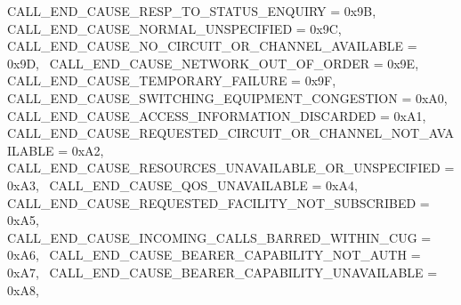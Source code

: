 \begin{DoxyItemize}
 C\+A\+L\+L\+\_\+\+E\+N\+D\+\_\+\+C\+A\+U\+S\+E\+\_\+\+R\+E\+S\+P\+\_\+\+T\+O\+\_\+\+S\+T\+A\+T\+U\+S\+\_\+\+E\+N\+Q\+U\+I\+RY = 0x9B,~\newline
 C\+A\+L\+L\+\_\+\+E\+N\+D\+\_\+\+C\+A\+U\+S\+E\+\_\+\+N\+O\+R\+M\+A\+L\+\_\+\+U\+N\+S\+P\+E\+C\+I\+F\+I\+ED = 0x9C,~\newline
 C\+A\+L\+L\+\_\+\+E\+N\+D\+\_\+\+C\+A\+U\+S\+E\+\_\+\+N\+O\+\_\+\+C\+I\+R\+C\+U\+I\+T\+\_\+\+O\+R\+\_\+\+C\+H\+A\+N\+N\+E\+L\+\_\+\+A\+V\+A\+I\+L\+A\+B\+LE = 0x9D,~\newline
 C\+A\+L\+L\+\_\+\+E\+N\+D\+\_\+\+C\+A\+U\+S\+E\+\_\+\+N\+E\+T\+W\+O\+R\+K\+\_\+\+O\+U\+T\+\_\+\+O\+F\+\_\+\+O\+R\+D\+ER = 0x9E,~\newline
 C\+A\+L\+L\+\_\+\+E\+N\+D\+\_\+\+C\+A\+U\+S\+E\+\_\+\+T\+E\+M\+P\+O\+R\+A\+R\+Y\+\_\+\+F\+A\+I\+L\+U\+RE = 0x9F,~\newline
 C\+A\+L\+L\+\_\+\+E\+N\+D\+\_\+\+C\+A\+U\+S\+E\+\_\+\+S\+W\+I\+T\+C\+H\+I\+N\+G\+\_\+\+E\+Q\+U\+I\+P\+M\+E\+N\+T\+\_\+\+C\+O\+N\+G\+E\+S\+T\+I\+ON = 0x\+A0,~\newline
 C\+A\+L\+L\+\_\+\+E\+N\+D\+\_\+\+C\+A\+U\+S\+E\+\_\+\+A\+C\+C\+E\+S\+S\+\_\+\+I\+N\+F\+O\+R\+M\+A\+T\+I\+O\+N\+\_\+\+D\+I\+S\+C\+A\+R\+D\+ED = 0x\+A1,~\newline
 C\+A\+L\+L\+\_\+\+E\+N\+D\+\_\+\+C\+A\+U\+S\+E\+\_\+\+R\+E\+Q\+U\+E\+S\+T\+E\+D\+\_\+\+C\+I\+R\+C\+U\+I\+T\+\_\+\+O\+R\+\_\+\+C\+H\+A\+N\+N\+E\+L\+\_\+\+N\+O\+T\+\_\+\+A\+V\+A\+I\+L\+A\+B\+LE = 0x\+A2,~\newline
 C\+A\+L\+L\+\_\+\+E\+N\+D\+\_\+\+C\+A\+U\+S\+E\+\_\+\+R\+E\+S\+O\+U\+R\+C\+E\+S\+\_\+\+U\+N\+A\+V\+A\+I\+L\+A\+B\+L\+E\+\_\+\+O\+R\+\_\+\+U\+N\+S\+P\+E\+C\+I\+F\+I\+ED = 0x\+A3,~\newline
 C\+A\+L\+L\+\_\+\+E\+N\+D\+\_\+\+C\+A\+U\+S\+E\+\_\+\+Q\+O\+S\+\_\+\+U\+N\+A\+V\+A\+I\+L\+A\+B\+LE = 0x\+A4,~\newline
 C\+A\+L\+L\+\_\+\+E\+N\+D\+\_\+\+C\+A\+U\+S\+E\+\_\+\+R\+E\+Q\+U\+E\+S\+T\+E\+D\+\_\+\+F\+A\+C\+I\+L\+I\+T\+Y\+\_\+\+N\+O\+T\+\_\+\+S\+U\+B\+S\+C\+R\+I\+B\+ED = 0x\+A5,~\newline
 C\+A\+L\+L\+\_\+\+E\+N\+D\+\_\+\+C\+A\+U\+S\+E\+\_\+\+I\+N\+C\+O\+M\+I\+N\+G\+\_\+\+C\+A\+L\+L\+S\+\_\+\+B\+A\+R\+R\+E\+D\+\_\+\+W\+I\+T\+H\+I\+N\+\_\+\+C\+UG = 0x\+A6,~\newline
 C\+A\+L\+L\+\_\+\+E\+N\+D\+\_\+\+C\+A\+U\+S\+E\+\_\+\+B\+E\+A\+R\+E\+R\+\_\+\+C\+A\+P\+A\+B\+I\+L\+I\+T\+Y\+\_\+\+N\+O\+T\+\_\+\+A\+U\+TH = 0x\+A7,~\newline
 C\+A\+L\+L\+\_\+\+E\+N\+D\+\_\+\+C\+A\+U\+S\+E\+\_\+\+B\+E\+A\+R\+E\+R\+\_\+\+C\+A\+P\+A\+B\+I\+L\+I\+T\+Y\+\_\+\+U\+N\+A\+V\+A\+I\+L\+A\+B\+LE = 0x\+A8,~\newline

\end{DoxyItemize}
